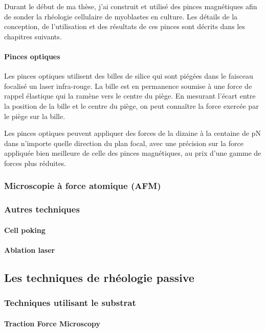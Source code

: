 \documentclass{report}
\begin{document}
Durant le début de ma thèse, j'ai construit et utilisé des pinces magnétiques afin de sonder la rhéologie cellulaire de myoblastes en culture. Les détails de la conception, de l'utilisation et des résultats de ces pinces sont décrits dans les chapitres suivants. 


\paragraph{Pinces optiques}

Les pinces optiques utilisent des billes de silice qui sont piégées dans le faisceau focalisé un laser infra-rouge. 
La bille est en permanence soumise à une force de rappel élastique qui la ramène vers le centre du piège. 
En mesurant l'écart entre la position de la bille et le centre du piège, on peut connaître la force exercée par le piège sur la bille. 

Les pinces optiques peuvent appliquer des forces de la dizaine à la centaine de pN dans n'importe quelle direction du plan focal, avec une précision sur la force appliquée bien meilleure de celle des pinces magnétiques, au prix d'une gamme de forces plus réduites. 

\subsubsection{Microscopie à force atomique (AFM)}

\subsubsection{Autres techniques}
\paragraph{Cell poking}

\paragraph{Ablation laser}

\subsection{Les techniques de rhéologie passive}
\subsubsection{Techniques utilisant le substrat}
\paragraph{Traction Force Microscopy}
\end{document}
